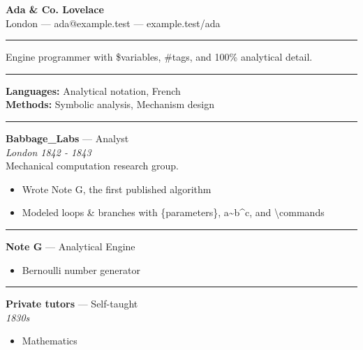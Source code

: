 \documentclass[10.5pt,letterpaper]{article}
\newcommand{\jtsection}[1]{\par\vspace{9pt}{\large\bfseries #1}\par\vspace{2pt}\hrule\vspace{4pt}\par}
\newenvironment{jtitems}
  {\begin{itemize}\setlength{\itemsep}{1.5pt}\setlength{\parskip}{0pt}\setlength{\parsep}{0pt}\setlength{\topsep}{2pt}}
  {\end{itemize}}
\begin{document}
{\LARGE\bfseries Ada \& Co. Lovelace}\\[3pt]
London — ada@example.test — example.test/ada
\jtsection{Summary}
Engine programmer with \$variables, \#tags, and 100\% analytical detail.
\jtsection{Technical Skills}
\textbf{Languages:} Analytical notation, French\\
\textbf{Methods:} Symbolic analysis, Mechanism design
\jtsection{Experience}
\textbf{Babbage\_Labs} --- Analyst\\
\textit{London \textperiodcentered{} 1842 - 1843}\\[1pt]
Mechanical computation research group.\\[1pt]
\begin{jtitems}
\item Wrote Note G, the first published algorithm
\item Modeled loops \& branches with \{parameters\}, a\textasciitilde{}b\textasciicircum{}c, and \textbackslash{}commands
\end{jtitems}
\jtsection{Projects}
\textbf{Note G} --- Analytical Engine\\[1pt]
\begin{jtitems}
\item Bernoulli number generator
\end{jtitems}
\jtsection{Education}
\textbf{Private tutors} --- Self-taught\\
\textit{1830s}\\[1pt]
\begin{jtitems}
\item Mathematics
\end{jtitems}
\end{document}
